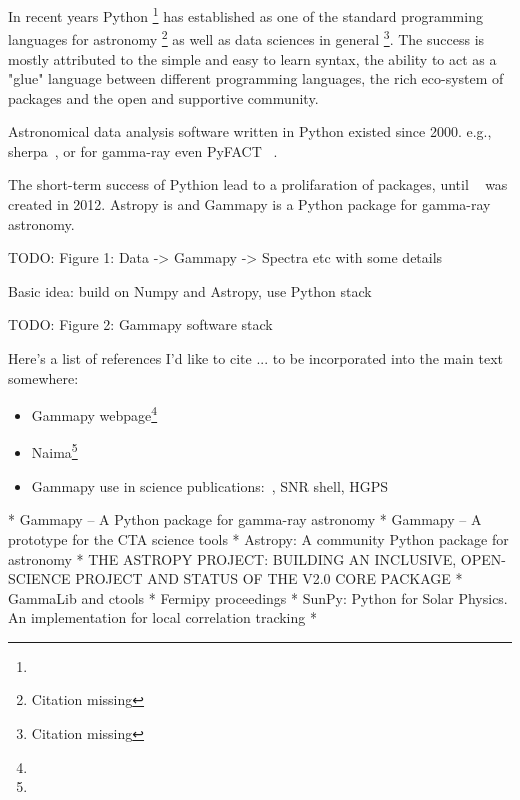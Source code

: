 In recent years Python \footnote{\PythonUrl} has established as one of the
standard programming  languages for astronomy \footnote{Citation missing} as
well as data sciences in  general \footnote{Citation missing}. The success is
mostly attributed to the simple and easy to learn syntax, the ability to act as
a "glue" language between different programming languages, the rich eco-system
of packages and the open and supportive community.

Astronomical data analysis software written in Python existed since 2000. e.g.,
sherpa~\citep{sherpa-2011, sherpa-2009}, or for gamma-ray even PyFACT
~\citep{pyfact}.

The short-term success of Pythion lead to a prolifaration of packages, until
\astropy~\citep{astropy} was created in 2012. Astropy is and Gammapy is a
Python package for gamma-ray astronomy.



TODO: Figure 1: Data -> Gammapy -> Spectra etc with some details

Basic idea: build on Numpy and Astropy, use Python stack

TODO: Figure 2: Gammapy software stack

Here's a list of references I'd like to cite ... to be incorporated into the
main text somewhere:

\begin{itemize}
	\item Gammapy webpage\footnote{\GammapyUrl}
	\item Naima\footnote{\NaimaUrl}~\citep{Naima}
	\item Gammapy use in science publications:~\citep{Owen2015}, SNR shell, HGPS
\end{itemize}

* Gammapy – A Python package for gamma-ray astronomy
* Gammapy – A prototype for the CTA science tools
* Astropy: A community Python package for astronomy
* THE ASTROPY PROJECT: BUILDING AN INCLUSIVE, OPEN-SCIENCE PROJECT AND STATUS
OF THE V2.0 CORE PACKAGE * GammaLib and ctools * Fermipy proceedings * SunPy:
Python for Solar Physics. An implementation for local correlation tracking *

